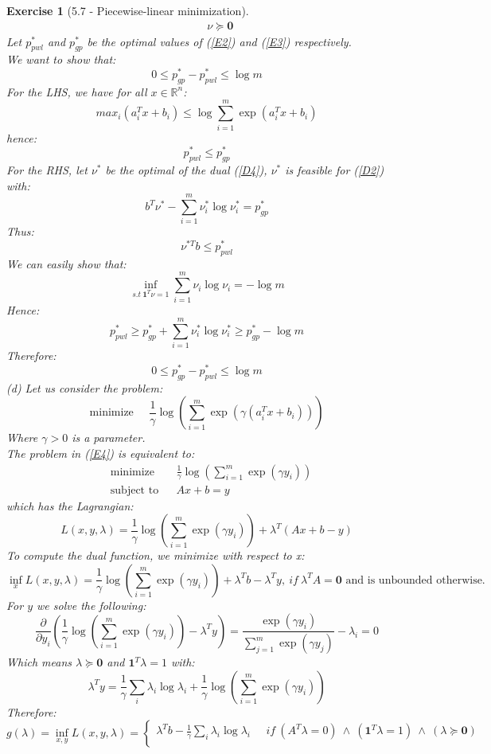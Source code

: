 \documentclass[11pt]{article}
\theoremstyle{exo}
\newtheorem*{exercise}{Exercise}
\newcommand{\R}{\mathbb{R}}
\newcommand{\1}{\mathbf{1}}
\newcommand{\0}{\mathbf{0}}
\begin{document}
\begin{exercise}[5.7 - Piecewise-linear minimization]
\begin{equation}
\begin{aligned}
&  & & \nu\succeq\0
\end{aligned}
\end{equation}
Let $p^*_{pwl}$ and $p^*_{gp}$ be the optimal values of (\ref{E2}) and (\ref{E3}) respectively.\\
We want to show that:
\[ 0\leq p^*_{gp}- p^*_{pwl}\leq \log m\]
For the LHS, we have for all $x\in\R^n$:
\[max_i(a_i^Tx+b_i)\leq\log\sum_{i=1}^m\exp(a_i^Tx+b_i)\]
hence: 
\[p^*_{pwl}\leq p^*_{gp}\]
For the RHS, let $\nu^*$ be the optimal of the dual (\ref{D4}), $\nu^*$ is feasible for (\ref{D2}) with:
\[b^T\nu^*-\sum_{i=1}^m\nu^*_i\log\nu^*_i=p^*_{gp} \]
Thus:
\[\nu^{*T}b\leq p^*_{pwl}\]
We can easily show that:
\[
\inf_{s.t\:\1^T\nu=1}\sum_{i=1}^m\nu_i\log\nu_i=-\log m
\]
Hence:
\[p^*_{pwl}\geq p^*_{gp}+\sum_{i=1}^m\nu^*_i\log\nu^*_i\geq p^*_{gp}-\log m \]
Therefore:
\[ 0\leq p^*_{gp}- p^*_{pwl}\leq \log m\]
(d) Let us consider the problem:
\begin{equation}
\label{E4}
\text{minimize}\phantom{abc}\frac{1}{\gamma}\log\left(\sum_{i=1}^m\exp(\gamma(a_i^Tx+b_i))\right)
\end{equation}
Where $\gamma>0$ is a parameter.\\
The problem in (\ref{E4}) is equivalent to:
\begin{equation*}
\begin{aligned}
& {\text{minimize}} & &  \frac{1}{\gamma}\log\left(\sum_{i=1}^m\exp(\gamma y_i)\right) \\
& \text{subject to} & & Ax+b=y
\end{aligned}
\end{equation*}
which has the Lagrangian:
\[L(x,y,\lambda)=\frac{1}{\gamma}\log\left(\sum_{i=1}^m\exp(\gamma y_i)\right)+\lambda^T(Ax+b-y)\]
To compute the dual function, we minimize with respect to x:
\[\inf_xL(x,y,\lambda)=\frac{1}{\gamma}\log\left(\sum_{i=1}^m\exp(\gamma y_i)\right)+\lambda^Tb-\lambda^Ty,\:if\:\lambda^TA=\0\text{ and is unbounded otherwise.}\]
For $y$ we solve the following:
\[\frac{\partial}{\partial y_i}(\frac{1}{\gamma}\log\left(\sum_{i=1}^m\exp(\gamma y_i)\right)-\lambda^Ty)=\frac{\exp(\gamma y_i)}{\sum_{j=1}^m\exp(\gamma y_j)}-\lambda_i=0\]
Which means $\lambda\succeq \0$ and $\1^T\lambda=1$ with:
\[\lambda^Ty=\frac{1}{\gamma}\sum_i\lambda_i\log\lambda_i+\frac{1}{\gamma}\log\left(\sum_{i=1}^m\exp(\gamma y_i)\right)\]
Therefore:
\[g(\lambda)=\inf_{x,y}L(x,y,\lambda)=\begin{cases}
\lambda^Tb-\frac{1}{\gamma}\sum_i\lambda_i\log\lambda_i\phantom{abc}if\:(A^T\lambda=0)\:\wedge\:(\1^T\lambda=1)\:\wedge\:(\lambda\succeq\0)\\

\end{cases}\]
\end{exercise}
\end{document}

